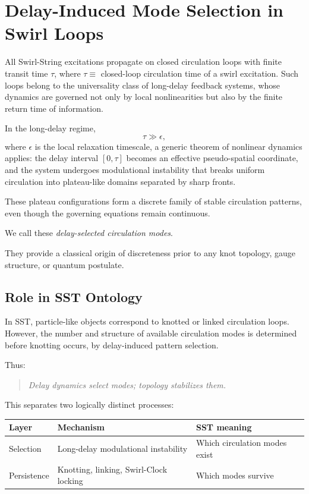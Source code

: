 \documentclass[10pt]{article}
\begin{document}
    \section{Delay-Induced Mode Selection in Swirl Loops}
    \label{sec:delay_mode_selection}

All Swirl-String excitations propagate on closed circulation loops with finite transit time $\tau$, where $\tau \equiv$ closed-loop circulation time of a swirl excitation.
Such loops belong to the universality class of long-delay feedback systems, whose dynamics are governed not only by local nonlinearities but also by the finite return time of information.

In the long-delay regime,
\begin{equation}
    \tau \gg \epsilon,
\end{equation}
where $\epsilon$ is the local relaxation timescale, a generic theorem of nonlinear dynamics applies:
the delay interval $[0,\tau]$ becomes an effective pseudo-spatial coordinate, and the system undergoes modulational instability that breaks uniform circulation into plateau-like domains separated by sharp fronts.

These plateau configurations form a discrete family of stable circulation patterns, even though the governing equations remain continuous.

We call these \emph{delay-selected circulation modes}.

They provide a classical origin of discreteness prior to any knot topology, gauge structure, or quantum postulate.

\subsection{Role in SST Ontology}

In SST, particle-like objects correspond to knotted or linked circulation loops.
However, the number and structure of available circulation modes is determined before knotting occurs, by delay-induced pattern selection.

Thus:
\begin{quote}
\textit{Delay dynamics select modes; topology stabilizes them.}
\end{quote}

This separates two logically distinct processes:

\begin{center}
\begin{tabular}{lll}
\toprule
Layer & Mechanism & SST meaning \\
\midrule
Selection & Long-delay modulational instability & Which circulation modes exist \\
Persistence & Knotting, linking, Swirl-Clock locking & Which modes survive \\
\bottomrule
\end{tabular}
\end{center}
\end{document}
